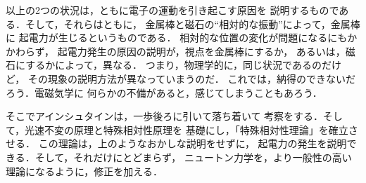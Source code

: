     以上の2つの状況は，ともに電子の運動を引き起こす原因を
    説明するものである．そして，それらはともに，
    金属棒と磁石の“相対的な振動”によって，金属棒に
    起電力が生じるというものである．
    相対的な位置の変化が問題になるにもかかわらず，
    起電力発生の原因の説明が，視点を金属棒にするか，
    あるいは，磁石にするかによって，異なる．
    つまり，物理学的に，同じ状況であるのだけど，
    その現象の説明方法が異なっていまうのだ．
    これでは，納得のできないだろう．電磁気学に
    何らかの不備があると，感じてしまうこともあろう．

    そこでアインシュタインは，一歩後ろに引いて落ち着いて
    考察をする．そして，光速不変の原理と特殊相対性原理を
    基礎にし，「特殊相対性理論」を確立させる．
    この理論は，上のようなおかしな説明をせずに，
    起電力の発生を説明できる．そして，それだけにとどまらず，
    ニュートン力学を，より一般性の高い理論になるように，修正を加える．

